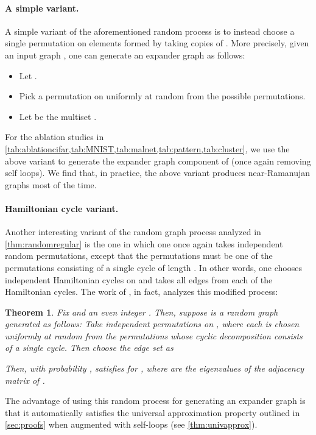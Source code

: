 \documentclass{article}
\theoremstyle{plain}
\newtheorem{theorem}{Theorem}[section]
\theoremstyle{definition}
\theoremstyle{remark}
\begin{document}
\paragraph{A simple variant.} A simple variant of the aforementioned random process is to instead choose a single permutation on  elements formed by taking  copies of . More precisely, given an input graph , one can generate an expander graph  as follows:
\begin{itemize}
    \item Let .
    \item Pick a permutation  on  uniformly at random from the  possible permutations.
    \item Let  be the multiset .
\end{itemize}
For the ablation studies in \cref{tab:ablationcifar,tab:MNIST,tab:malnet,tab:pattern,tab:cluster}, we use the above variant to generate the expander graph component of  (once again removing self loops). We find that, in practice, the above variant produces near-Ramanujan graphs most of the time.

\paragraph{Hamiltonian cycle variant.} Another interesting variant of the random graph process analyzed in \cref{thm:randomregular} is the one in which one once again takes  independent random permutations, except that the permutations must be one of the  permutations consisting of a single cycle of length . In other words, one chooses  independent Hamiltonian cycles on  and takes all edges from each of the Hamiltonian cycles. The work of \citet{Friedman03}, in fact, analyzes this modified process:

\begin{theorem}\citep[Theorem 1.2]{Friedman03}
 Fix  and an even integer . Then, suppose  is a random graph generated as follows: Take independent permutations  on , where each  is chosen uniformly at random from the  permutations whose cyclic decomposition consists of a single cycle. Then choose the edge set as
 
 Then, with probability ,
  satisfies
  for , where  are the eigenvalues of the adjacency matrix of . 
\end{theorem}
The advantage of using this random process for generating an expander graph is that it automatically satisfies the universal approximation property outlined in \cref{sec:proofs} when augmented with self-loops (see \cref{thm:univapprox}).
\end{document}
